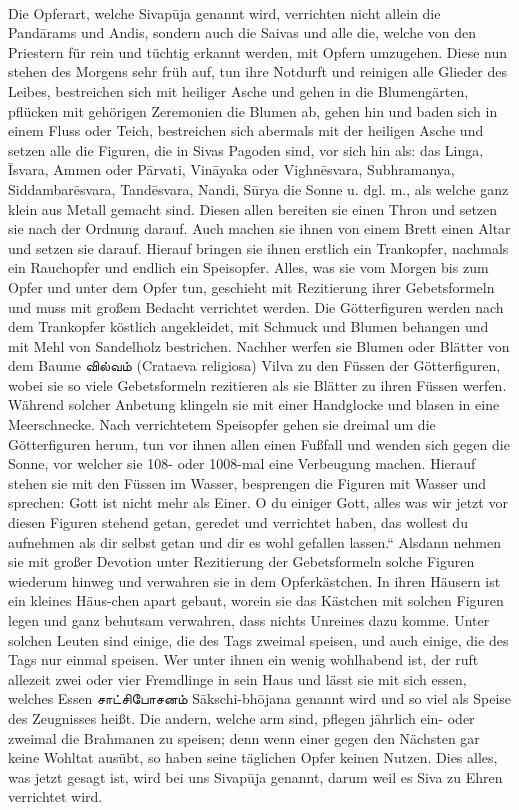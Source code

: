 \documentclass{article}
\newcommand{\TamilText}[1]{\texttamil{#1}}
\newcommand{\tam}[1]{\TamilText{#1}}
\begin{document}
\paragraph{}
Die Opferart, welche Sivap\={u}ja genannt wird, verrichten nicht allein die Pand\={a}rams und Andis, sondern auch die Saivas und alle die, welche von den Priestern für rein und tüchtig erkannt werden, mit Opfern umzugehen. Diese nun stehen des Morgens sehr früh auf, tun ihre Notdurft und reinigen alle Glieder des Leibes, bestreichen sich mit heiliger Asche und gehen in die Blumengärten, pflücken mit gehörigen Zeremonien die Blumen ab, gehen hin und baden sich in einem Fluss oder Teich, bestreichen sich abermals mit der heiligen Asche und setzen alle die Figuren, die in Sivas Pagoden sind, vor sich hin als: das Linga, \={I}svara, Ammen oder P\={a}rvati, Vin\={a}yaka oder Vighn\={e}svara, Subhramanya, Siddambar\={e}svara, Tand\={e}svara, Nandi, S\={u}rya die Sonne u. dgl. m., als welche ganz klein aus Metall gemacht sind. Diesen allen bereiten sie einen Thron und setzen sie nach der Ordnung darauf. Auch machen sie ihnen von einem Brett einen Altar und setzen sie darauf. Hierauf bringen sie ihnen erstlich ein Trankopfer, nachmals ein Rauchopfer und endlich ein Speisopfer. Alles, was sie vom Morgen bis zum Opfer und unter dem Opfer tun, geschieht mit Rezitierung ihrer Gebetsformeln und muss mit großem Bedacht verrichtet werden. Die Götterfiguren werden nach dem Trankopfer köstlich angekleidet, mit Schmuck und Blumen behangen und mit Mehl von Sandelholz bestrichen. Nachher werfen sie Blumen oder Blätter von dem Baume \tam{வில்வம்} (Crataeva religiosa) Vilva zu den Füssen der Götterfiguren, wobei sie so viele Gebetsformeln rezitieren als sie Blätter zu ihren Füssen werfen. Während solcher Anbetung klingeln sie mit einer Handglocke und blasen in eine Meerschnecke. Nach verrichtetem Speisopfer gehen sie dreimal um die Götterfiguren herum, tun vor ihnen allen einen Fußfall und wenden sich gegen die Sonne, vor welcher sie 108- oder 1008-mal eine Verbeugung machen. Hierauf stehen sie mit den Füssen im Wasser, besprengen die Figuren mit Wasser und sprechen: Gott ist nicht mehr als Einer. O du einiger Gott, alles was wir jetzt vor diesen Figuren stehend getan, geredet und verrichtet haben, das wollest du aufnehmen als dir selbst getan und dir es wohl gefallen lassen.“ Alsdann nehmen sie mit großer Devotion unter Rezitierung der Gebetsformeln solche Figuren wiederum hinweg und verwahren sie in dem Opferkästchen. In ihren Häusern ist ein kleines Häus-chen apart gebaut, worein sie das Kästchen mit solchen Figuren legen und ganz behutsam verwahren, dass nichts Unreines dazu komme. Unter solchen Leuten sind einige, die des Tags zweimal speisen, und auch einige, die des Tags nur einmal speisen. Wer unter ihnen ein wenig wohlhabend ist, der ruft allezeit zwei oder vier Fremdlinge in sein Haus und lässt sie mit sich essen, welches Essen \tam{சாட்சிபோசனம்} S\={a}kschi-bh\={o}jana genannt wird und so viel als Speise des Zeugnisses heißt. Die andern, welche arm sind, pflegen jährlich ein- oder zweimal die Brahmanen zu speisen; denn wenn einer gegen den Nächsten gar keine Wohltat ausübt, so haben seine täglichen Opfer keinen Nutzen. Dies alles, was jetzt gesagt ist, wird bei uns Sivap\={u}ja genannt, darum weil es Siva zu Ehren verrichtet wird.
\end{document}
